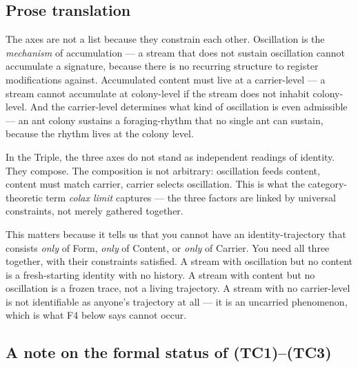 \documentclass[11pt, openany]{book}
\begin{document}
\subsection{Prose translation}

The axes are not a list because they constrain each other. Oscillation is the \textit{mechanism} of accumulation --- a stream that does not sustain oscillation cannot accumulate a signature, because there is no recurring structure to register modifications against. Accumulated content must live at a carrier-level --- a stream cannot accumulate at colony-level if the stream does not inhabit colony-level. And the carrier-level determines what kind of oscillation is even admissible --- an ant colony sustains a foraging-rhythm that no single ant can sustain, because the rhythm lives at the colony level.

In the Triple, the three axes do not stand as independent readings of identity. They compose. The composition is not arbitrary: oscillation feeds content, content must match carrier, carrier selects oscillation. This is what the category-theoretic term \textit{colax limit} captures --- the three factors are linked by universal constraints, not merely gathered together.

This matters because it tells us that you cannot have an identity-trajectory that consists \textit{only} of Form, \textit{only} of Content, or \textit{only} of Carrier. You need all three together, with their constraints satisfied. A stream with oscillation but no content is a fresh-starting identity with no history. A stream with content but no oscillation is a frozen trace, not a living trajectory. A stream with no carrier-level is not identifiable as anyone's trajectory at all --- it is an uncarried phenomenon, which is what F4 below says cannot occur.

\subsection{A note on the formal status of (TC1)–(TC3)}
\end{document}
